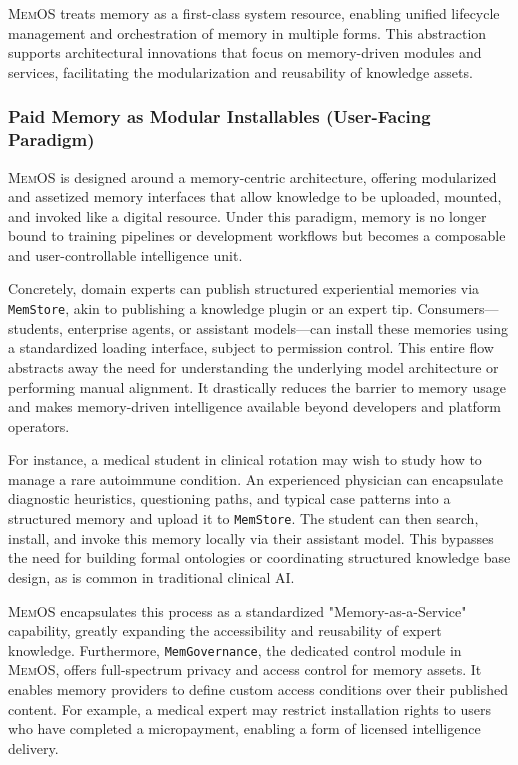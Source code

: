 \documentclass[]{memtensor}
\begin{document}
\textsc{MemOS} treats memory as a first-class system resource, enabling unified lifecycle management and orchestration of memory in multiple forms.
This abstraction supports architectural innovations that focus on memory-driven modules and services, facilitating the modularization and reusability of knowledge assets.

\subsubsection{Paid Memory as Modular Installables (User-Facing Paradigm)}

\textsc{MemOS} is designed around a memory-centric architecture, offering modularized and assetized memory interfaces that allow knowledge to be uploaded, mounted, and invoked like a digital resource.
Under this paradigm, memory is no longer bound to training pipelines or development workflows but becomes a composable and user-controllable intelligence unit.

Concretely, domain experts can publish structured experiential memories via \texttt{MemStore}, akin to publishing a knowledge plugin or an expert tip.
Consumers—students, enterprise agents, or assistant models—can install these memories using a standardized loading interface, subject to permission control.
This entire flow abstracts away the need for understanding the underlying model architecture or performing manual alignment.
It drastically reduces the barrier to memory usage and makes memory-driven intelligence available beyond developers and platform operators.

For instance, a medical student in clinical rotation may wish to study how to manage a rare autoimmune condition.
An experienced physician can encapsulate diagnostic heuristics, questioning paths, and typical case patterns into a structured memory and upload it to \texttt{MemStore}.
The student can then search, install, and invoke this memory locally via their assistant model.
This bypasses the need for building formal ontologies or coordinating structured knowledge base design, as is common in traditional clinical AI.

\textsc{MemOS} encapsulates this process as a standardized "Memory-as-a-Service" capability, greatly expanding the accessibility and reusability of expert knowledge.
Furthermore, \texttt{MemGovernance}, the dedicated control module in \textsc{MemOS}, offers full-spectrum privacy and access control for memory assets.
It enables memory providers to define custom access conditions over their published content.
For example, a medical expert may restrict installation rights to users who have completed a micropayment, enabling a form of licensed intelligence delivery.
\end{document}
